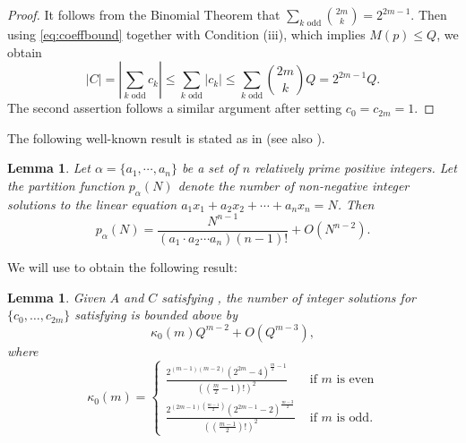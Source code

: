 \documentclass[12pt]{amsart}
\theoremstyle{plain}
\newtheorem{lemma}[theorem]{Lemma}
\begin{document}
\begin{proof}
    It follows from the Binomial Theorem that $\sum_{k\text{ odd}}\binom{2m}{k}=2^{2m-1}$. Then using \eqref{eq:coeffbound} together with Condition (iii), which implies $M(p)\leq Q$, we obtain
    \[ |C|= |\sum_{k\text{ odd}} c_k| \leq \sum_{k\text{ odd}} |c_k| 
    \leq \sum_{k\text{ odd}} \binom{2m}{k} Q = 2^{2m-1} Q. \]
    The second assertion follows a similar argument after setting $c_0=c_{2m}=1$.
\end{proof}


The following well-known result is stated as in \cite{MR1705753} (see also \cite{Netto,MR271277}).

\begin{lemma}\label{th:partitionfn}
    Let $\alpha=\{a_1,\cdots,a_n\}$ be a set of $n$ relatively prime positive integers. Let the partition function $p_\alpha(N)$ denote the number of non-negative integer solutions to the linear equation $ a_1x_1+a_2x_2+\cdots+a_nx_n=N$. Then
    \[ p_\alpha(N) = \frac{N^{n-1}}{(a_1\cdot a_2\cdots a_n)(n-1)!} + O(N^{n-2}). \]
\end{lemma}

We will use  to obtain the following result:

\begin{lemma} \label{lem:ck count}
Given $A$ and $C$ satisfying , the number of integer solutions for $\{c_0,\dots,c_{2m}\}$ satisfying  is bounded above by
\[
    \kappa_0(m) Q^{m-2} + O(Q^{m-3}),
\]
where 
\[ \kappa_0(m)=
    \begin{cases}
         \frac{2^{(m-1)(m-2)}(2^{2m}-4)^{\frac{m}{2}-1}}{\left( (\frac{m}{2}-1)! \right)^2} & \text{ if $m$ is even} \\
         \frac{2^{(2m-1)(\frac{m-1}{2})}(2^{2m-1}-2)^{\frac{m-3}{2}}}{\left( (\frac{m-1}{2})! \right)^2} & \text{ if $m$ is odd} .
    \end{cases} 
\]
\end{lemma}
\end{document}
